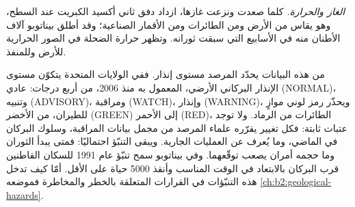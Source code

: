 \begin{omfigure}
\centering
{}
\par{}
\end{omfigure}

\emph{الغاز والحرارة.} كلما صعدت  ونزعت غازها، ازداد دفق ثاني أكسيد الكبريت عند
السطح، وهو يقاس من الأرض ومن الطائرات ومن
الأقمار الصناعية؛ وقد أطلق بيناتوبو آلاف الأطنان منه في الأسابيع التي سبقت ثورانه.
وتظهر حرارة  الضحلة في الصور الحرارية للأرض وللمنفذ.

من هذه البيانات يحدّد المرصد مستوى إنذار. ففي الولايات المتحدة يتكوّن
مستوى الإنذار البركاني الأرضي، المعمول به منذ 2006، من أربع درجات: عادي (NORMAL)،
وتنبيه (ADVISORY)، ومراقبة (WATCH)، وإنذار (WARNING)، ويحذّر رمز لوني موازٍ للطيران، من الأخضر (GREEN) إلى الأحمر (RED)،
الطائرات من الرماد. ولا توجد عتبات ثابتة: فكل تغيير يقرّره
علماء المرصد من مجمل بيانات المراقبة، وسلوك البركان في الماضي،
وما يُعرف عن العمليات الجارية. ويبقى التنبّؤ
احتماليًا: فمتى يبدأ الثوران وما حجمه أمران يصعب
توقّعهما. وفي بيناتوبو سمح تنبّؤ عام 1991 للسكان القاطنين قرب
البركان بالابتعاد في الوقت المناسب وأنقذ \num{5000} حياة على الأقل. أمّا كيف تدخل هذه التنبّؤات
في القرارات المتعلقة بالخطر والمخاطرة فموضعه \cref{ch:b2:geological-hazards}.

